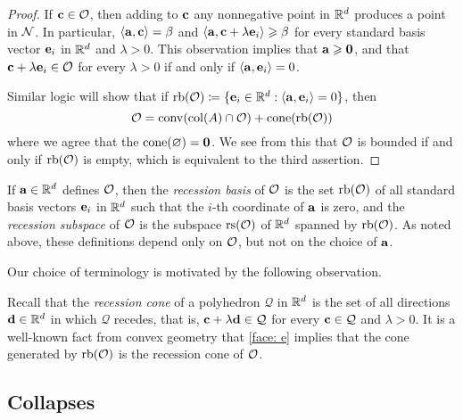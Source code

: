 \documentclass[11pt]{amsart}
\begin{document}
\begin{proof}  If $\mathbf{c} \in \mathcal{O}$, then adding to $\mathbf{c}$ any nonnegative point in $\mathbb{R}^d$ produces a point in $\mathcal{N}$.  In particular, $\langle \mathbf{a}, \mathbf{c} \rangle = \beta$ and $\langle \mathbf{a}, \mathbf{c} + \lambda \mathbf{e}_i \rangle \geqslant \beta$ for every standard basis vector $\mathbf{e}_i$ in $\mathbb{R}^d$ and $\lambda > 0$.  This observation implies that $\mathbf{a} \geqslant \mathbf{0}$, and that $\mathbf{c} + \lambda \mathbf{e}_i \in \mathcal{O}$ for every $\lambda > 0$ if and only if $\langle \mathbf{a}, \mathbf{e}_i \rangle = 0$.  

Similar logic will show that if $\operatorname{rb}(\mathcal{O}) \coloneqq  \{ \mathbf{e}_i \in \mathbb{R}^d : \langle \mathbf{a}, \mathbf{e}_i \rangle = 0\}$, then 
\begin{equation}
\label{face: e}
\mathcal{O} =  \operatorname{conv}( \operatorname{col}(A) \cap \mathcal{O} ) + \operatorname{cone}(\operatorname{rb}(\mathcal{O}))
\end{equation}
where we agree that the $\operatorname{cone}(\varnothing) = \mathbf{0}$.  We see from this that $\mathcal{O}$ is bounded if and only if $\operatorname{rb}(\mathcal{O})$ is empty, which is equivalent to the third assertion.  
\end{proof}

\begin{definition}
   If $\mathbf{a} \in \mathbb{R}^d$ defines $\mathcal{O}$, then the \emph{recession basis} of $\mathcal{O}$ is the set $\operatorname{rb}(\mathcal{O})$ of all standard basis vectors $\mathbf{e}_i$ in $\mathbb{R}^d$ such that the $i$-th coordinate of $\mathbf{a}$ is zero, and the \emph{recession subspace} of $\mathcal{O}$ is the subspace $\operatorname{rs}(\mathcal{O})$ of $\mathbb{R}^d$ spanned by $\operatorname{rb}(\mathcal{O})$.  
   As noted above, these definitions depend only on $\mathcal{O}$, but not on the choice of $\mathbf{a}$.
\end{definition}


Our choice of terminology is motivated by the following observation.

\begin{remark}  Recall that the \emph{recession cone} of a polyhedron $\mathcal{Q}$ in $\mathbb{R}^d$ is the set of all directions $\mathbf{d} \in \mathbb{R}^d$ in which $\mathcal{Q}$ recedes, that is, $\mathbf{c} + \lambda \mathbf{d} \in \mathcal{Q}$ for every $\mathbf{c} \in \mathcal{Q}$ and $\lambda > 0$.  It is a well-known fact from convex geometry that  \eqref{face: e} implies that the cone generated by $\operatorname{rb}(\mathcal{O})$ is the recession cone of $\mathcal{O}$.
\end{remark}

\subsection{Collapses} 
\end{document}
